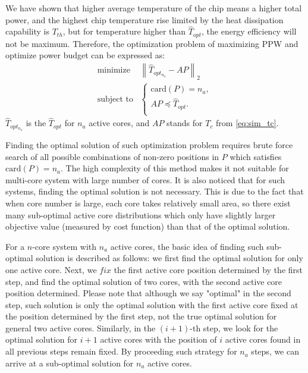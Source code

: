 We have shown that higher average temperature of the chip means a higher
total power, and the highest
chip temperature rise limited by the heat dissipation capability is
$T_{th}$, but for temperature higher than $\hat{T}_{opt}$, the energy efficiency will not be maximum. Therefore, the optimization problem of maximizing PPW and optimize power budget can be expressed as:
\begin{equation}\label{eq:sim_opt_topt}
\begin{split}
\text{minimize } &  \left \| \hat{T}_{opt_{n_{a}}} - AP \right \|_{2}\\
\text{subject to} &\left\{
\begin{array}{lr}
\text{card}(P) = n_{a},\\
AP \preceq \hat{T}_{opt}.\\
\end{array}
\right.
\end{split}
\end{equation}
$\hat{T}_{opt_{n_{a}}}$ is the $\hat{T}_{opt}$ for $n_{a}$ active cores, and $AP$ stands for $T_{c}$ from \eqref{eq:sim_tc}.


Finding the optimal solution of such optimization problem requires brute force search of all possible combinations of non-zero positions in $P$ which satisfies $\text{card}(P)=n_{a}$. The high complexity of this method makes it not suitable for multi-core system with large number of cores. It is also noticed that for such systems, finding the optimal solution is not necessary. This is due to the fact that when core number is large, each core takes relatively small area, so there exist many sub-optimal active core distributions which only have slightly larger objective value (measured by cost function) than that of the optimal solution. 

For a $n$-core system with $n_{a}$ active cores, the basic idea of finding such sub-optimal solution is described as follows: we first find the optimal solution for only one active core. Next, we $fix$ the first active core position determined by the first step, and find the optimal solution of two cores, with the second active core position determined. Please note that although we say "optimal" in the second step, such solution is only the optimal solution with the first active core fixed at the position determined by the first step, not the true optimal solution for general two active cores. Similarly, in the $(i+1)$-th step, we look for the optimal solution for $i+1$ active cores with the position of $i$ active cores found in all previous steps remain fixed. By proceeding such strategy for $n_{a}$ steps, we can arrive at a sub-optimal solution for $n_{a}$ active cores.


